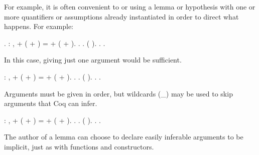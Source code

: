 \documentclass[12pt]{report}
\begin{document}
For example, it is often convenient to  or  
using a lemma or hypothesis with one or more quantifiers or 
assumptions already instantiated in order to direct what
happens.  For example: \begin{coqdoccode}
\coqdocemptyline
\coqdocnoindent
{} .\coqdoceol
\coqdocemptyline
\coqdocnoindent
{}  : \coqdockw{\ensuremath{\forall}}   ,  + ( + ) =  + ( + ).\coqdoceol
\coqdocnoindent
{}.\coqdoceol
\coqdocindent{1.50em}
   .\coqdoceol
\coqdocindent{1.50em}
 (  ). \coqdocindent{1.50em}
. .\coqdoceol
\coqdocemptyline
\end{coqdoccode}
In this case, giving just one argument would be sufficient. \begin{coqdoccode}
\coqdocemptyline
\coqdocnoindent
{}  : \coqdockw{\ensuremath{\forall}}   ,  + ( + ) =  + ( + ).\coqdoceol
\coqdocnoindent
{}.\coqdoceol
\coqdocindent{1.50em}
   .\coqdoceol
\coqdocindent{1.50em}
 ( ).\coqdoceol
\coqdocindent{1.50em}
. .\coqdoceol
\coqdocemptyline
\end{coqdoccode}
Arguments must be given in order, but wildcards (\_)
may be used to skip arguments that Coq can infer.  \begin{coqdoccode}
\coqdocemptyline
\coqdocnoindent
{}  : \coqdockw{\ensuremath{\forall}}   ,  + ( + ) =  + ( + ).\coqdoceol
\coqdocnoindent
{}.\coqdoceol
\coqdocindent{1.00em}
   .\coqdoceol
\coqdocindent{1.00em}
 ( \coqdocvar{\_} ).\coqdoceol
\coqdocindent{1.00em}
. .\coqdoceol
\coqdocemptyline
\end{coqdoccode}
The author of a lemma can choose to declare easily inferable arguments
to be implicit, just as with functions and constructors. 
\end{document}
